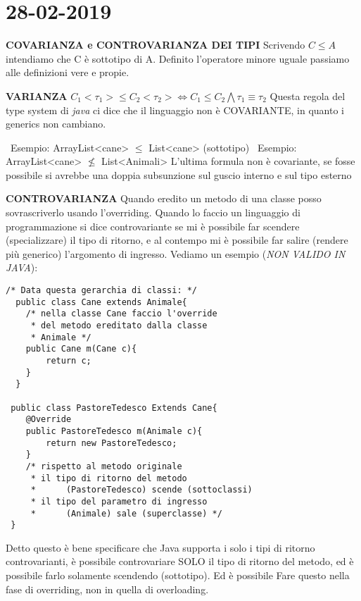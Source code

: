 

\newpage
\section{28-02-2019}
\textbf{COVARIANZA e CONTROVARIANZA DEI TIPI }\newline
Scrivendo  $C \leq A$ intendiamo che C è sottotipo di A. Definito l'operatore minore uguale passiamo alle definizioni vere e propie.

\noindent \textbf{VARIANZA} \newline
$C_{1} <\tau_{1}> \leq C_{2}<\tau_{2}> \Leftrightarrow C_{1} \leq C_{2} \bigwedge \tau_{1}\equiv \tau_{2} $
\newline
Questa regola del type system di \textit{java} ci dice che il linguaggio non è COVARIANTE, in quanto i generics non cambiano. 

\noindent \textbullet\ Esempio: ArrayList<cane> $\leq$ List<cane> (sottotipo) \newline
\textbullet\ Esempio: ArrayList<cane> $\nleq$ List<Animali> \newline
L'ultima formula non è covariante, se fosse possibile si avrebbe una doppia subsunzione sul guscio interno e sul tipo esterno \newline

\noindent \textbf{CONTROVARIANZA} \newline
Quando eredito un metodo di una classe posso sovrascriverlo usando l'overriding. Quando lo faccio un linguaggio di programmazione si dice controvariante se mi è possibile far scendere (specializzare) il tipo di ritorno, e al contempo mi è possibile far salire (rendere più generico) l'argomento di ingresso. Vediamo un esempio (\textit{NON VALIDO IN JAVA}):
\begin{lstlisting}[basicstyle=\small,]
/* Data questa gerarchia di classi: */
  public class Cane extends Animale{
	/* nella classe Cane faccio l'override
 	 * del metodo ereditato dalla classe
 	 * Animale */  
	public Cane m(Cane c){
		return c;
	}
  }
  
 public class PastoreTedesco Extends Cane{
 	@Override
	public PastoreTedesco m(Animale c){
		return new PastoreTedesco;
	}
	/* rispetto al metodo originale
	 * il tipo di ritorno del metodo 
	 *		(PastoreTedesco) scende (sottoclassi)
 	 * il tipo del parametro di ingresso 
 	 * 		(Animale) sale (superclasse) */	
 }
\end{lstlisting}

\noindent Detto questo è bene specificare che Java supporta i solo i tipi di ritorno controvarianti, è possibile controvariare SOLO il tipo di ritorno del metodo, ed è possibile farlo solamente scendendo (sottotipo). Ed è possibile Fare questo nella fase di overriding, non in quella di overloading.

